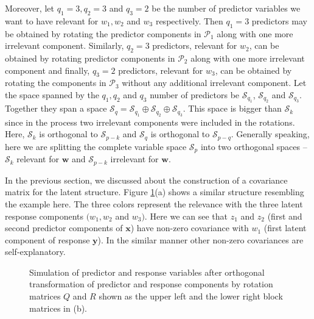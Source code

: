 \documentclass[review]{elsarticle}
\theoremstyle{definition}
\theoremstyle{definition}
\theoremstyle{definition}
\theoremstyle{remark}
\begin{document}
Moreover, let \(q_1 = 3, q_2 = 3\) and \(q_3 = 2\) be the number of
predictor variables we want to have relevant for \(w_1, w_2\) and
\(w_3\) respectively. Then \(q_1 = 3\) predictors may be obtained by
rotating the predictor components in \(\mathcal{P}_1\) along with one
more irrelevant component. Similarly, \(q_2 = 3\) predictors, relevant
for \(w_2\), can be obtained by rotating predictor components in
\(\mathcal{P}_2\) along with one more irrelevant component and finally,
\(q_3 = 2\) predictors, relevant for \(w_3\), can be obtained by
rotating the components in \(\mathcal{P}_3\) without any additional
irrelevant component. Let the space spanned by the \(q_1, q_2\) and
\(q_3\) number of predictors be \(\mathcal{S}_{q_1}\),
\(\mathcal{S}_{q_2}\) and \(\mathcal{S}_{q_3}\). Together they span a
space
\(\mathcal{S}_q = \mathcal{S}_{q_1} \oplus \mathcal{S}_{q_2} \oplus \mathcal{S}_{q_3}\).
This space is bigger than \(\mathcal{S}_k\) since in the process two
irrelevant components were included in the rotations. Here,
\(\mathcal{S}_k\) is orthogonal to \(\mathcal{S}_{p - k}\) and
\(\mathcal{S}_q\) is orthogonal to \(\mathcal{S}_{p - q}\). Generally
speaking, here we are splitting the complete variable space
\(\mathcal{S}_p\) into two orthogonal spaces -- \(\mathcal{S}_k\)
relevant for \(\mathbf{w}\) and \(\mathcal{S}_{p - k}\) irrelevant for
\(\mathbf{w}\).

In the previous section, we discussed about the construction of a
covariance matrix for the latent structure. Figure
\ref{fig:cov-plot-print}(a) shows a similar structure resembling the
example here. The three colors represent the relevance with the three
latent response components \((w_1, w_2\) and \(w_3)\). Here we can see
that \(z_{1}\) and \(z_{2}\) (first and second predictor components of
\(\mathbf{x}\)) have non-zero covariance with \(w_1\) (first latent
component of response \(\mathbf{y}\)). In the similar manner other
non-zero covariances are self-explanatory.

\begin{figure}[!htb]
\caption{Simulation of predictor and response variables after orthogonal transformation of predictor and response components by rotation matrices $Q$ and $R$ shown as the upper left and the lower right block matrices in (b).}\label{fig:cov-plot-print}
\end{figure}
\end{document}
